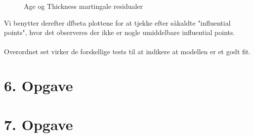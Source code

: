     \begin{figure}[h]
    \centering
    \hfill
  \hfill
    \caption{Age og Thickness martingale residualer}
    \label{fig:enter-label}
\end{figure}

\noindent Vi benytter derefter dfbeta plottene for at tjekke efter såkaldte "influential points", hvor det observeres der ikke er nogle umiddelbare influential points.\\\\
\noindent Overordnet set virker de forskellige tests til at indikere at modellen er et godt fit.



\chapter{6. Opgave}
\chapter{7. Opgave}




